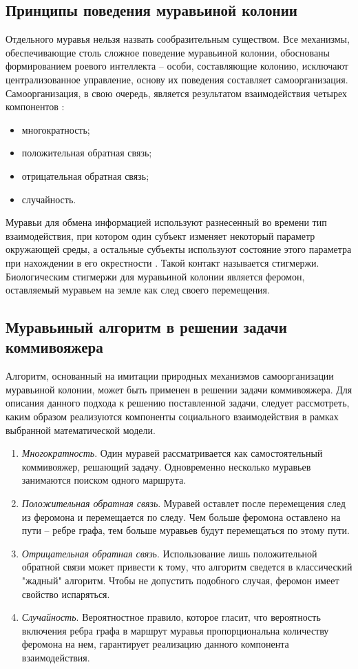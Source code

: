 \subsection{Принципы поведения муравьиной колонии}
Отдельного муравья нельзя назвать сообразительным существом. Все механизмы, обеспечивающие столь сложное поведение муравьиной колонии, обоснованы формированием роевого интеллекта -- особи, составляющие колонию, исключают централизованное управление, основу их поведения составляет самоорганизация. Самоорганизация, в свою очередь, является результатом взаимодействия четырех компонентов \cite{ant-orig}:
\begin{itemize}
	\item многократность;
	\item положительная обратная связь;
	\item отрицательная обратная связь;
	\item случайность.
\end{itemize} 
Муравьи для обмена информацией используют разнесенный во времени тип взаимодействия, при котором один субъект изменяет некоторый параметр окружающей среды, а остальные субъекты используют состояние этого параметра при нахождении в его окрестности \cite{ant-orig}. Такой контакт называется стигмержи. Биологическим стигмержи для муравьиной колонии является феромон, оставляемый муравьем на земле как след своего перемещения. 

\subsection{Муравьиный алгоритм в решении задачи коммивояжера}
Алгоритм, основанный на имитации природных механизмов самоорганизации муравьиной колонии, может быть применен в решении задачи коммивояжера. Для описания данного подхода к решению поставленной задачи, следует рассмотреть, каким образом реализуются компоненты социального взаимодействия в рамках выбранной математической модели.
\begin{enumerate}
	\item \textit{Многократность}. Один муравей рассматривается как самостоятельный коммивояжер, решающий задачу. Одновременно несколько муравьев занимаются поиском одного маршрута.
	\item \textit{Положительная обратная связь}. Муравей оставлет после перемещения след из феромона и перемещается по следу. Чем больше феромона оставлено на пути -- ребре графа, тем больше муравьев будут перемещаться по этому пути.
	\item \textit{Отрицательная обратная связь}. Использование лишь положительной обратной связи может привести к тому, что алгоритм сведется в классический "жадный"  алгоритм. Чтобы не допустить подобного случая, феромон имеет свойство испаряться.
	\item \textit{Случайность}. Вероятностное правило, которое гласит, что вероятность  включения ребра графа в маршрут муравья пропорциональна количеству феромона на нем, гарантирует реализацию данного компонента взаимодействия.
\end{enumerate}
